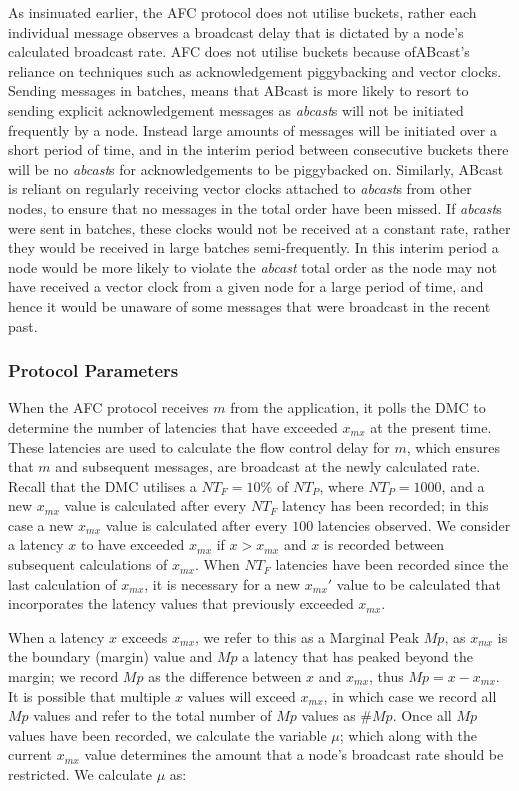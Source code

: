     As insinuated earlier, the AFC protocol does not utilise buckets, rather each individual message observes a broadcast delay that is dictated by a node's calculated broadcast rate.  AFC does not utilise buckets because of\textsf{ABcast}'s reliance on techniques such as acknowledgement piggybacking and vector clocks.  Sending messages in batches, means that \textsf{ABcast} is more likely to resort to sending explicit acknowledgement messages as \emph{abcast}s will not be initiated frequently by a node.  Instead large amounts of messages will be initiated over a short period of time, and in the interim period between consecutive buckets there will be no \emph{abcast}s for acknowledgements to be piggybacked on.  Similarly, \textsf{ABcast} is reliant on regularly receiving vector clocks attached to \emph{abcast}s from other nodes, to ensure that no messages in the total order have been missed.  If \emph{abcast}s were sent in batches, these clocks would not be received at a constant rate, rather they would be received in large batches semi-frequently.  In this interim period a node would be more likely to violate the \emph{abcast} total order as the node may not have received a vector clock from a given node for a large period of time, and hence it would be unaware of some messages that were broadcast in the recent past.  
   
   \subsubsection*{Protocol Parameters}  
   When the AFC protocol receives $m$ from the application, it polls the DMC to determine the number of latencies that have exceeded $x_{mx}$ at the present time.  These latencies are used to calculate the flow control delay for $m$, which ensures that $m$ and subsequent messages, are broadcast at the newly calculated rate.  Recall that the DMC utilises a $NT_F = 10\%$ of $NT_P$, where $NT_P = 1000$, and a new $x_{mx}$ value is calculated after every $NT_F$ latency has been recorded; in this case a new $x_{mx}$ value is calculated after every $100$ latencies observed.    We consider a latency $x$ to have exceeded $x_{mx}$ if $x > x_{mx}$ and $x$ is recorded between subsequent calculations of $x_{mx}$.  When $NT_F$ latencies have been recorded since the last calculation of $x_{mx}$, it is necessary for a new $x_{mx}'$ value to be calculated that incorporates the latency values that previously exceeded $x_{mx}$.  
       
    When a latency $x$ exceeds $x_{mx}$, we refer to this as a Marginal Peak $Mp$, as $x_{mx}$ is the boundary (margin) value and $Mp$ a latency that has peaked beyond the margin; we record $Mp$ as the difference between $x$ and $x_{mx}$, thus $Mp = x - x_{mx}$.  It is possible that multiple $x$ values will exceed $x_{mx}$, in which case we record all $Mp$ values and refer to the total number of $Mp$ values as $\#Mp$.   Once all $Mp$ values have been recorded, we calculate the variable $\mu$; which along with the current $x_{mx}$ value determines the amount that a node's broadcast rate should be restricted.  We calculate $\mu$ as:
    
